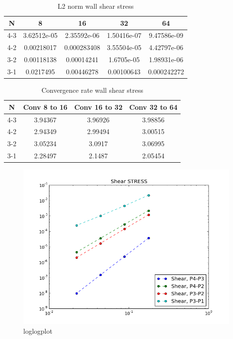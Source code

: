 \documentclass[a4paper,norsk]{article}
\begin{document}
\begin{table}[ht]
\caption {L2 norm wall shear stress} 
\centering
\begin{tabular}{c|cccc}
\hline
\rowcolor{LightCyan}
N  &  8  &  16  &  32 &  64\\
\hline
4-3 & 3.62512e-05 & 2.35592e-06 & 1.50416e-07 & 9.47586e-09 \\ \hline
4-2 & 0.00218017  & 0.000283408 & 3.55504e-05 & 4.42797e-06 \\ \hline
3-2 & 0.00118138  & 0.00014241  & 1.6705e-05  & 1.98931e-06 \\ \hline
3-1 & 0.0217495   & 0.00446278  & 0.00100643  & 0.000242272 \\
\hline
\end{tabular}
\end{table}

\begin{table}[ht]
\caption {Convergence rate wall shear stress} 
\centering
\begin{tabular}{c|ccc}
\hline
\rowcolor{LightCyan}
N  & Conv 8 to 16  &  Conv 16 to 32 &  Conv 32 to 64 \\
\hline
4-3 & 3.94367 & 3.96926 & 3.98856   \\ \hline
4-2 & 2.94349 & 2.99494 & 3.00515  \\ \hline
3-2 & 3.05234 & 3.0917  & 3.06995  \\ \hline
3-1 & 2.28497 & 2.1487  & 2.05454  \\
\hline
\end{tabular}
\end{table}

\begin{figure}[h!]
	\centering
	\caption*{loglogplot}
	\includegraphics[scale=0.4]{shear.png}
\end{figure}
\end{document}
